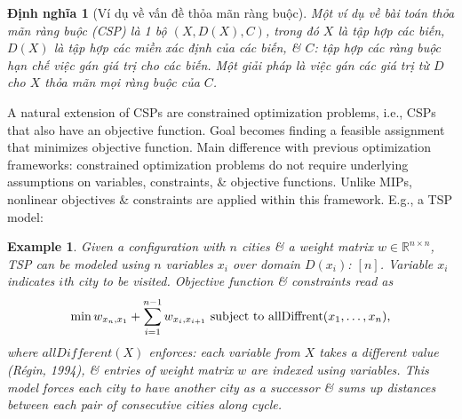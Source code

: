 \documentclass{article}
\newtheorem{dinhnghia}{Định nghĩa}
\newtheorem{example}{Example}
\begin{document}
\begin{itemize}
\begin{itemize}
\begin{itemize}
            \begin{dinhnghia}[Ví dụ về vấn đề thỏa mãn ràng buộc]
                Một ví dụ về bài toán thỏa mãn ràng buộc (CSP) là 1 bộ $(X,D(X),C)$, trong đó $X$ là tập hợp các biến, $D(X)$ là tập hợp các miền xác định của các biến, \& $C$: tập hợp các ràng buộc hạn chế việc gán giá trị cho các biến. Một giải pháp là việc gán các giá trị từ $D$ cho $X$ thỏa mãn mọi ràng buộc của $C$.
            \end{dinhnghia}
            A natural extension of CSPs are constrained optimization problems, i.e., CSPs that also have an objective function. Goal becomes finding a feasible assignment that minimizes objective function. Main difference with previous optimization frameworks: constrained optimization problems do not require underlying assumptions on variables, constraints, \& objective functions. Unlike MIPs, nonlinear objectives \& constraints are applied within this framework. E.g., a TSP model:

            \begin{example}
                Given a configuration with $n$ cities \& a weight matrix $w\in\mathbb{R}^{n\times n}$, TSP can be modeled using $n$ variables $x_i$ over domain $D(x_i)$: $[n]$. Variable $x_i$ indicates $i$th city to be visited. Objective function \& constraints read as
                \begin{equation*}
                    \min w_{x_n,x_1} + \sum_{i=1}^{n-1} w_{x_i,x_{i+1}}\mbox{ subject to } {\rm allDiffrent}(x_1,\ldots,x_n),
                \end{equation*}
                where $allDifferent(X)$ enforces: each variable from $X$ takes a different value (Régin, 1994), \& entries of weight matrix $w$ are indexed using variables. This model forces each city to have another city as a successor \& sums up distances between each pair of consecutive cities along cycle.


\end{example}
\end{itemize}
\end{itemize}
\end{itemize}
\end{document}
